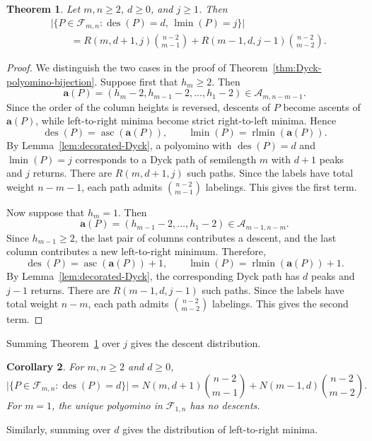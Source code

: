 \documentclass[12pt]{amsart}
\theoremstyle{plain}
\newtheorem{theorem}{Theorem}[section]
\newtheorem{coro}[theorem]{Corollary}
\theoremstyle{definition}
\DeclareMathOperator{\des}{des}
\newcommand{\F}{{\mathcal F}}
\DeclareMathOperator{\asc}{asc}
\DeclareMathOperator{\rlmin}{rlmin}
\DeclareMathOperator{\lmin}{lmin}
\begin{document}
\begin{theorem}\label{thm:joint-descents-minima}
Let $m,n\geq2$, $d\geq0$, and $j\geq1$. Then
\begin{align*}
&\bigl|
\{P\in\F_{m,n}:
\des(P)=d,\,
\lmin(P)=j\}
\bigr|\\
&\qquad =
R(m,d+1,j)
\binom{n-2}{m-1}
+
R(m-1,d,j-1)
\binom{n-2}{m-2}.
\end{align*}
\end{theorem}


\begin{proof}
We distinguish the two cases in the proof of
Theorem~\ref{thm:Dyck-polyomino-bijection}. Suppose first that
$h_m\geq2$. Then
\[
\mathbf a(P)
=
(h_m-2,h_{m-1}-2,\ldots,h_1-2)
\in\mathcal A_{m,n-m-1}.
\]
Since the order of the column heights is reversed, descents of $P$
become ascents of $\mathbf a(P)$, while left-to-right minima become
strict right-to-left minima. Hence
\[
\des(P)=\asc(\mathbf a(P)),
\qquad
\lmin(P)=\rlmin(\mathbf a(P)).
\]
By Lemma~\ref{lem:decorated-Dyck}, a polyomino with $\des(P)=d$ and
$\lmin(P)=j$ corresponds to a Dyck path of semilength $m$ with $d+1$
peaks and $j$ returns. There are $R(m,d+1,j)$ such paths. Since the
labels have total weight $n-m-1$, each path admits
$\binom{n-2}{m-1}$ labelings. This gives the first term.

Now suppose that $h_m=1$. Then
\[
\mathbf a(P)
=
(h_{m-1}-2,\ldots,h_1-2)
\in\mathcal A_{m-1,n-m}.
\]
Since $h_{m-1}\geq2$, the last pair of columns contributes a descent,
and the last column contributes a new left-to-right minimum. Therefore,
\[
\des(P)=\asc(\mathbf a(P))+1,
\qquad
\lmin(P)=\rlmin(\mathbf a(P))+1.
\]
By Lemma~\ref{lem:decorated-Dyck}, the corresponding Dyck path has $d$
peaks and $j-1$ returns. There are $R(m-1,d,j-1)$ such paths. Since the
labels have total weight $n-m$, each path admits
$\binom{n-2}{m-2}$ labelings. This gives the second term.
\end{proof}

Summing Theorem~\ref{thm:joint-descents-minima} over $j$ gives the
descent distribution.

\begin{coro}\label{cor:descent-distribution}
For $m,n\geq2$ and $d\geq0$,
\[
\bigl|
\{P\in\F_{m,n}:\des(P)=d\}
\bigr|
=
N(m,d+1)\binom{n-2}{m-1}
+
N(m-1,d)\binom{n-2}{m-2}.
\]
For $m=1$, the unique polyomino in $\F_{1,n}$ has no descents.
\end{coro}

Similarly, summing over $d$ gives the distribution of left-to-right
minima.
\end{document}
